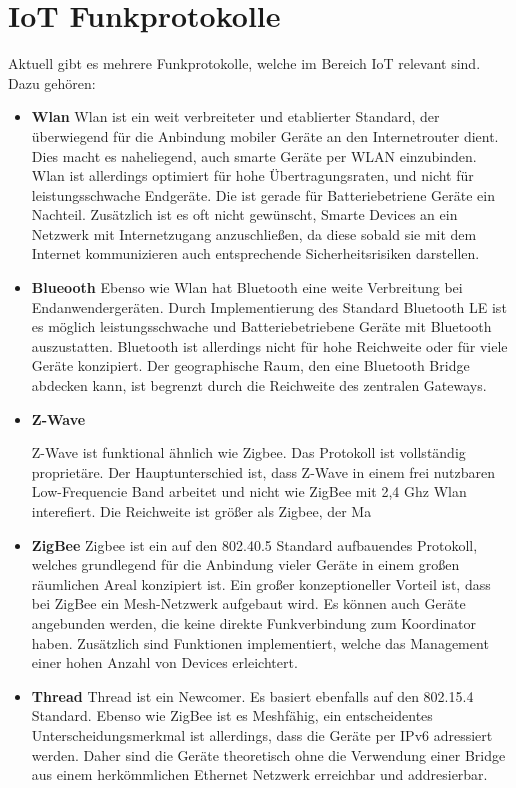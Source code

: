 \section{IoT Funkprotokolle}
Aktuell gibt es mehrere Funkprotokolle, welche im Bereich IoT relevant sind. Dazu gehören:
\begin{itemize}
    \item \textbf{Wlan}
    Wlan ist ein weit verbreiteter und etablierter Standard, der überwiegend für die Anbindung mobiler Geräte an den
    Internetrouter dient. Dies macht es naheliegend, auch smarte Geräte per WLAN einzubinden. Wlan ist allerdings 
    optimiert für hohe Übertragungsraten, und nicht für leistungsschwache Endgeräte. Die ist
    gerade für Batteriebetriene Geräte ein Nachteil. Zusätzlich ist es oft nicht gewünscht, Smarte Devices
    an ein Netzwerk mit Internetzugang anzuschließen, da diese sobald sie mit dem Internet kommunizieren auch entsprechende
    Sicherheitsrisiken darstellen.

    \item \textbf{Blueooth}
    Ebenso wie Wlan hat Bluetooth eine weite Verbreitung bei Endanwendergeräten. Durch Implementierung 
    des Standard Bluetooth LE ist es möglich leistungsschwache und Batteriebetriebene Geräte mit Bluetooth auszustatten. Bluetooth
    ist allerdings nicht für hohe Reichweite oder für viele Geräte konzipiert. Der geographische Raum, den eine Bluetooth
    Bridge abdecken kann, ist begrenzt durch die Reichweite des zentralen Gateways.

    \item \textbf{Z-Wave}
    
    Z-Wave ist funktional ähnlich wie Zigbee. Das Protokoll ist vollständig proprietäre. Der Hauptunterschied ist, dass Z-Wave in einem frei nutzbaren
    Low-Frequencie Band arbeitet und nicht wie ZigBee mit 2,4 Ghz Wlan interefiert. Die Reichweite ist größer als Zigbee, der Ma

    \item \textbf{ZigBee}
    Zigbee ist ein auf den 802.40.5 Standard aufbauendes Protokoll, welches grundlegend für die Anbindung vieler
    Geräte in einem großen räumlichen Areal konzipiert ist. Ein großer konzeptioneller Vorteil ist, dass bei 
    ZigBee ein Mesh-Netzwerk aufgebaut wird. Es können auch Geräte angebunden werden, die keine direkte Funkverbindung
    zum Koordinator haben. Zusätzlich sind Funktionen implementiert, welche das Management einer hohen Anzahl von Devices
    erleichtert.
    
    \item \textbf{Thread}
    Thread ist ein Newcomer. Es basiert ebenfalls auf den 802.15.4 Standard. Ebenso wie ZigBee ist es Meshfähig, ein
    entscheidentes Unterscheidungsmerkmal ist allerdings, dass die Geräte per IPv6 adressiert werden. Daher sind die Geräte
    theoretisch ohne die Verwendung einer Bridge aus einem herkömmlichen Ethernet Netzwerk erreichbar und addresierbar.
\end{itemize}


